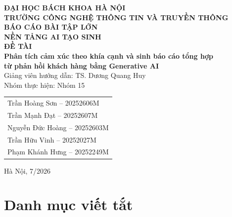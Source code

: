 \documentclass[11pt,a4paper]{article}
\begin{document}
\begin{titlepage}
\centering
\vspace*{0.5cm}
{\large\bfseries ĐẠI HỌC BÁCH KHOA HÀ NỘI}\\[0.2cm]
{\large\bfseries TRƯỜNG CÔNG NGHỆ THÔNG TIN VÀ TRUYỀN THÔNG}\\[1cm]
{\Large\bfseries BÁO CÁO BÀI TẬP LỚN}\\[0.6cm]
{\Large\bfseries NỀN TẢNG AI TẠO SINH}\\[1.2cm]
{\large\bfseries ĐỀ TÀI}\\[0.4cm]
{\Large\bfseries Phân tích cảm xúc theo khía cạnh và sinh báo cáo tổng hợp\\
từ phản hồi khách hàng bằng Generative AI}\\[1.8cm]

{\large Giảng viên hướng dẫn: TS. Dương Quang Huy}\\[0.4cm]
{\large Nhóm thực hiện: Nhóm 15}\\[0.6cm]

\begin{tabular}{l}
Trần Hoàng Sơn -- 20252606M \\
Trần Mạnh Đạt -- 20252607M \\
Nguyễn Đức Hoàng -- 20252603M \\
Trần Hữu Vinh -- 20252027M \\
Phạm Khánh Hưng -- 20252249M \\
\end{tabular}

\vfill
{\large Hà Nội, 7/2026}
\end{titlepage}

\tableofcontents
\clearpage

\section*{Danh mục viết tắt}
\end{document}
